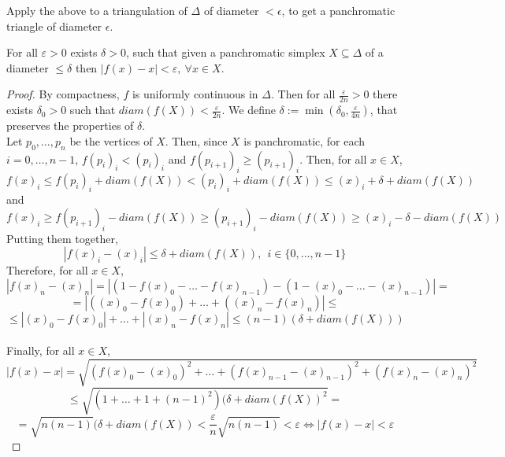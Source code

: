 Apply the above to a triangulation of $\Delta$ of diameter $<\epsilon$, to get a panchromatic triangle of diameter $\epsilon$.

\begin{lemma}
\label{small_panchromatic_simplex_has_almost_fixed_point}
For all $\varepsilon>0$ exists $\delta>0$, such that given a panchromatic simplex $X\subseteq \Delta$ of a diameter $\leq \delta$ then $|f(x) - x| < \varepsilon,\ \forall x \in X$.
\end{lemma}
\begin{proof}
By compactness, $f$ is uniformly continuous in $\Delta$. Then for all $\frac{\varepsilon}{2n}>0$ there exists $\delta_0>0$ such that  $diam(f(X)) < \frac{\varepsilon}{2n}$. We define $\delta:=\min(\delta_0,\frac{\varepsilon}{4n})$, that preserves the properties of $\delta$.\\
Let $p_0, \ldots, p_n$ be the vertices of $X$. Then, since $X$ is panchromatic, for each $i = 0,\ldots,n-1$, $f(p_i)_i < (p_i)_i$ and $f(p_{i+1})_i \geq (p_{i+1})_i$.
Then, for all $x \in X$,
$$f(x)_i \leq f(p_i)_i + diam(f(X)) < (p_i)_i + diam(f(X)) \leq (x)_i + \delta + diam(f(X))$$ and $$f(x)_i \geq f(p_{i+1})_i - diam(f(X)) \geq (p_{i+1})_i - diam(f(X)) \geq (x)_i - \delta - diam(f(X))$$
Putting them together,
$$|f(x)_i - (x)_i| \leq \delta + diam(f(X)),\ \ i\in\{0,...,n-1\}$$ 
Therefore, for all $x \in X$,
$$|f(x)_n - (x)_n| = |(1 - f(x)_0 - \ldots - f(x)_{n-1}) - (1 - (x)_0 - \ldots - (x)_{n-1})| = $$
$$ = |((x)_0 - f(x)_0) + \ldots + ((x)_n - f(x)_n)| \leq$$
$$\leq |(x)_0 - f(x)_0| + \ldots + |(x)_n - f(x)_n| \leq (n-1)(\delta + diam(f(X)))$$\\
Finally, for all $x \in X$,
$$|f(x) - x| = \sqrt{(f(x)_0 - (x)_0)^2 + \ldots + (f(x)_{n-1} - (x)_{n-1})^2 + (f(x)_n - (x)_n)^2}$$
$$\leq \sqrt{(1 + \ldots + 1 + (n - 1)^2)(\delta + diam(f(X))^2} = $$
$$ = \sqrt{n(n-1)}(\delta + diam(f(X)) < \frac{\varepsilon}{n}\sqrt{n(n-1)} < \varepsilon\Longleftrightarrow |f(x)-x|<\varepsilon$$
$ $
\end{proof}

